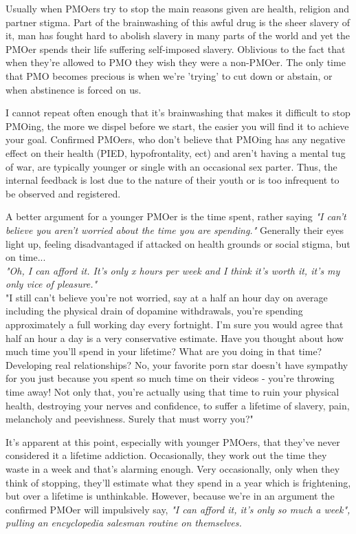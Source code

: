 \documentclass[easypeasy.tex]{subfiles}
\begin{document}
Usually when PMOers try to stop the main reasons given are health, religion and partner stigma. Part of the brainwashing of this awful drug is the sheer slavery of it, man has fought hard to abolish slavery in many parts of the world and yet the PMOer spends their life suffering self-imposed slavery. Oblivious to the fact that when they're allowed to PMO they wish they were a non-PMOer. The only time that PMO becomes precious is when we're 'trying' to cut down or abstain, or when abstinence is forced on us.

I cannot repeat often enough that it's brainwashing that makes it difficult to stop PMOing, the more we dispel before we start, the easier you will find it to achieve your goal. Confirmed PMOers, who don't believe that PMOing has any negative effect on their health (PIED, hypofrontality, ect) and aren't having a mental tug of war, are typically younger or single with an occasional sex parter. Thus, the internal feedback is lost due to the nature of their youth or is too infrequent to be observed and registered.

A better argument for a younger PMOer is the time spent, rather saying \textit{"I can't believe you aren't worried about the time you are spending."} Generally their eyes light up, feeling disadvantaged if attacked on health grounds or social stigma, but on time...\\
  \textit{"Oh, I can afford it. It's only x hours per week and I think it's worth it, it's my only vice of pleasure."}\\
  "I still can't believe you're not worried, say at a half an hour day on average including the physical drain of dopamine withdrawals, you're spending approximately a full working day every fortnight. I'm sure you would agree that half an hour a day is a very conservative estimate. Have you thought about how much time you'll spend in your lifetime? What are you doing in that time? Developing real relationships? No, your favorite porn star doesn't have sympathy for you just because you spent so much time on their videos - you're throwing time away! Not only that, you're actually using that time to ruin your physical health, destroying your nerves and confidence, to suffer a lifetime of slavery, pain, melancholy and peevishness. Surely that must worry you?"

It's apparent at this point, especially with younger PMOers, that they've never considered it a lifetime addiction. Occasionally, they work out the time they waste in a week and that's alarming enough. Very occasionally, only when they think of stopping, they'll estimate what they spend in a year which is frightening, but over a lifetime is unthinkable. However, because we're in an argument the confirmed PMOer will impulsively say, \textit{"I can afford it, it's only so much a week", pulling an encyclopedia salesman routine on themselves.}
\end{document}
